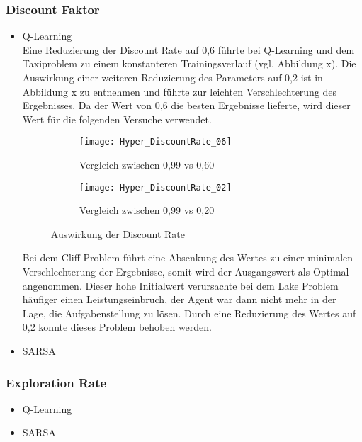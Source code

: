 \subsubsection{Discount Faktor}
\begin{itemize}
    \item Q-Learning\\
    Eine Reduzierung der Discount Rate auf 0,6 führte bei Q-Learning und dem Taxiproblem zu einem konstanteren Trainingsverlauf (vgl. Abbildung x).
    Die Auswirkung einer weiteren Reduzierung des Parameters auf 0,2 ist in Abbildung x zu entnehmen und führte zur leichten Verschlechterung des Ergebnisses.
    Da der Wert von 0,6 die besten Ergebnisse lieferte, wird dieser Wert für die folgenden Versuche verwendet.
    \begin{figure}[H]
        \centering
        \begin{subfigure}{.5\textwidth}
          \centering
          \texttt{[image: Hyper\_DiscountRate\_06]}
          \caption{Vergleich zwischen 0,99 vs 0,60}
          \label{fig:DiscountRate06}
        \end{subfigure}%
        \begin{subfigure}{.5\textwidth}
          \centering
          \texttt{[image: Hyper\_DiscountRate\_02]}
          \caption{Vergleich zwischen 0,99 vs 0,20}
          \label{fig:DiscountRate02}
        \end{subfigure}
        \caption{Auswirkung der Discount Rate}
        \label{fig:DiscountRate_Q-Learning}
    \end{figure}
    Bei dem Cliff Problem führt eine Absenkung des Wertes zu einer minimalen Verschlechterung der Ergebnisse, somit wird der Ausgangswert als Optimal angenommen. 
    Dieser hohe Initialwert verursachte bei dem Lake Problem häufiger einen Leistungseinbruch, der Agent war dann nicht mehr in der Lage, die Aufgabenstellung zu lösen.
    Durch eine Reduzierung des Wertes auf 0,2 konnte dieses Problem behoben werden.
    \item SARSA\\
\end{itemize}
\subsubsection{Exploration Rate}

\begin{itemize}
    \item Q-Learning\\
    \item SARSA\\
\end{itemize}

